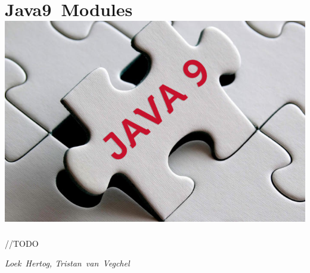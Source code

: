 
\section*{Java9~Modules\hfill\includegraphics[width=.35\linewidth]{images/java9-jigsaw.jpg}}
//TODO

\hfill\textit{Loek~Hertog, Tristan~van~Vegchel}